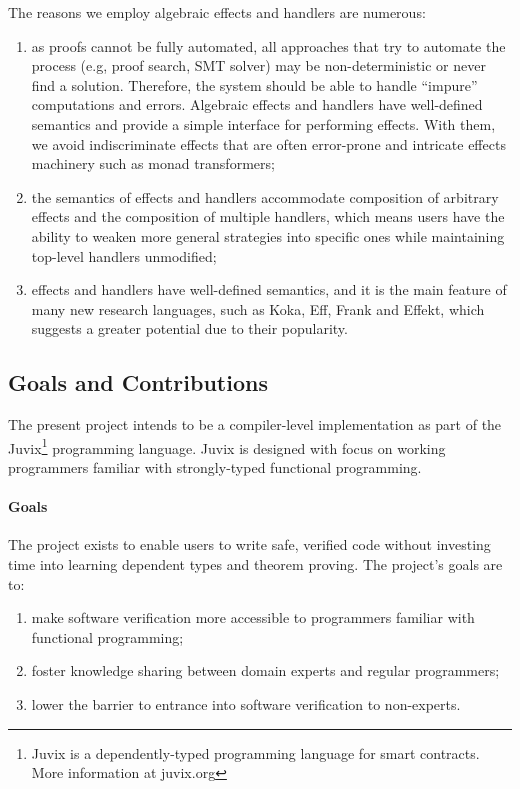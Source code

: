 \documentclass[sigconfl]{acmart}
\begin{document}
The reasons we employ algebraic effects and handlers are numerous:
\begin{enumerate}
\item as proofs cannot be fully automated, all approaches that try to automate
  the process (e.g, proof search, SMT solver) may be non-deterministic or
  never find a solution. Therefore, the system should be able to handle
  ``impure'' computations and errors. Algebraic effects and handlers have
  well-defined semantics and provide a simple interface for performing effects.
  With them, we avoid indiscriminate effects that are often error-prone and
  intricate effects machinery such as monad transformers;
\item the semantics of effects and handlers accommodate composition of arbitrary effects and the
  composition of multiple handlers, which means users have the ability to weaken
  more general strategies into specific ones while maintaining top-level
  handlers unmodified;
\item effects and handlers have well-defined semantics, and it is the main feature of many new
  research languages, such as Koka, Eff, Frank and Effekt, which suggests a greater
  potential due to their popularity.
\end{enumerate}

\subsection{Goals and Contributions}

The present project intends to be a compiler-level implementation as part of the
Juvix\footnote{Juvix is a dependently-typed programming language for smart
  contracts. More information at juvix.org} programming language. Juvix is designed
with focus on working programmers familiar with strongly-typed functional
programming.

\paragraph{Goals} The project exists to enable users to write safe, verified
code without investing time into learning dependent types and theorem proving.
The project's goals are to:
\begin{enumerate}
\item make software verification more accessible to programmers familiar with
  functional programming;
\item foster knowledge sharing between domain experts and regular programmers;
\item lower the barrier to entrance into software verification to non-experts.
\end{enumerate}
\end{document}
